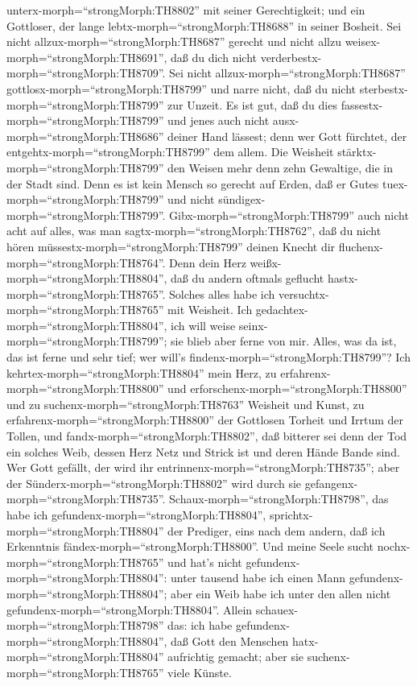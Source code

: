 unterx-morph=``strongMorph:TH8802'' mit seiner Gerechtigkeit; und ein
Gottloser, der lange lebtx-morph=``strongMorph:TH8688'' in seiner
Bosheit.  Sei nicht allzux-morph=``strongMorph:TH8687''
gerecht und nicht allzu weisex-morph=``strongMorph:TH8691'', daß du dich
nicht verderbestx-morph=``strongMorph:TH8709''.  Sei nicht
allzux-morph=``strongMorph:TH8687''
gottlosx-morph=``strongMorph:TH8799'' und narre nicht, daß du nicht
sterbestx-morph=``strongMorph:TH8799'' zur Unzeit.  Es ist
gut, daß du dies fassestx-morph=``strongMorph:TH8799'' und jenes auch
nicht ausx-morph=``strongMorph:TH8686'' deiner Hand lässest; denn wer
Gott fürchtet, der entgehtx-morph=``strongMorph:TH8799'' dem allem.
 Die Weisheit stärktx-morph=``strongMorph:TH8799'' den
Weisen mehr denn zehn Gewaltige, die in der Stadt sind. 
Denn es ist kein Mensch so gerecht auf Erden, daß er Gutes
tuex-morph=``strongMorph:TH8799'' und nicht
sündigex-morph=``strongMorph:TH8799''. 
Gibx-morph=``strongMorph:TH8799'' auch nicht acht auf alles, was man
sagtx-morph=``strongMorph:TH8762'', daß du nicht hören
müssestx-morph=``strongMorph:TH8799'' deinen Knecht dir
fluchenx-morph=``strongMorph:TH8764''.  Denn dein Herz
weißx-morph=``strongMorph:TH8804'', daß du andern oftmals geflucht
hastx-morph=``strongMorph:TH8765''.  Solches alles habe ich
versuchtx-morph=``strongMorph:TH8765'' mit Weisheit. Ich
gedachtex-morph=``strongMorph:TH8804'', ich will weise
seinx-morph=``strongMorph:TH8799''; sie blieb aber ferne von mir.
 Alles, was da ist, das ist ferne und sehr tief; wer will's
findenx-morph=``strongMorph:TH8799''?  Ich
kehrtex-morph=``strongMorph:TH8804'' mein Herz, zu
erfahrenx-morph=``strongMorph:TH8800'' und
erforschenx-morph=``strongMorph:TH8800'' und zu
suchenx-morph=``strongMorph:TH8763'' Weisheit und Kunst, zu
erfahrenx-morph=``strongMorph:TH8800'' der Gottlosen Torheit und Irrtum
der Tollen,  und fandx-morph=``strongMorph:TH8802'', daß
bitterer sei denn der Tod ein solches Weib, dessen Herz Netz und Strick
ist und deren Hände Bande sind. Wer Gott gefällt, der wird ihr
entrinnenx-morph=``strongMorph:TH8735''; aber der
Sünderx-morph=``strongMorph:TH8802'' wird durch sie
gefangenx-morph=``strongMorph:TH8735''. 
Schaux-morph=``strongMorph:TH8798'', das habe ich
gefundenx-morph=``strongMorph:TH8804'',
sprichtx-morph=``strongMorph:TH8804'' der Prediger, eins nach dem
andern, daß ich Erkenntnis fändex-morph=``strongMorph:TH8800''.
 Und meine Seele sucht nochx-morph=``strongMorph:TH8765''
und hat's nicht gefundenx-morph=``strongMorph:TH8804'': unter tausend
habe ich einen Mann gefundenx-morph=``strongMorph:TH8804''; aber ein
Weib habe ich unter den allen nicht
gefundenx-morph=``strongMorph:TH8804''.  Allein
schauex-morph=``strongMorph:TH8798'' das: ich habe
gefundenx-morph=``strongMorph:TH8804'', daß Gott den Menschen
hatx-morph=``strongMorph:TH8804'' aufrichtig gemacht; aber sie
suchenx-morph=``strongMorph:TH8765'' viele Künste.

